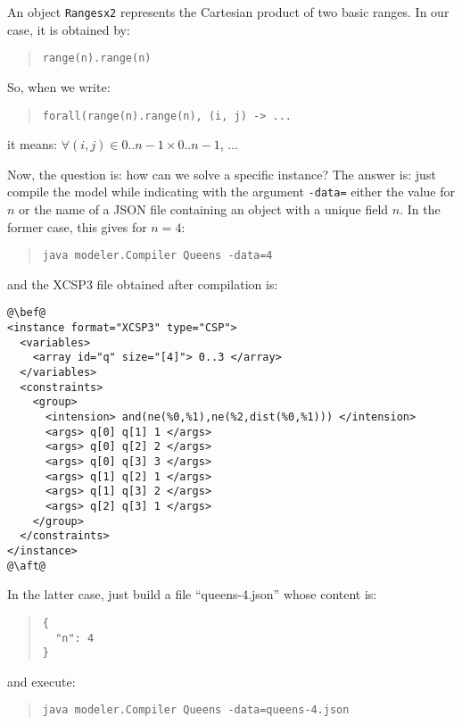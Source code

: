 \documentclass[10pt]{article}
\def\xt{{\rm XCSP3}\xspace}
\newcommand{\nn}[1]{{\tt #1}} %
\def\xt{{\rm XCSP3}\xspace}
\begin{document}
An object \nn{Rangesx2} represents the Cartesian product of two basic ranges. In our case, it is obtained by:
\begin{quote}
\begin{verbatim}
range(n).range(n)
\end{verbatim}
\end{quote}

So, when we write:
\begin{quote}
\begin{verbatim}
forall(range(n).range(n), (i, j) -> ...
\end{verbatim}
\end{quote}
it means: $\forall (i,j) \in 0..n-1 \times 0..n-1$, $\dots$

\bigskip
Now, the question is: how can we solve a specific instance?
The answer is: just compile the model while indicating with the argument \verb!-data=! either the value for $n$ or the name of a JSON file containing an object with a unique field $n$.
In the former case, this gives for $n=4$: 
\begin{quote}
\begin{verbatim}
java modeler.Compiler Queens -data=4
\end{verbatim}
\end{quote}

and the \xt file obtained after compilation is:

\begin{lstlisting}
@\bef@
<instance format="XCSP3" type="CSP">
  <variables>
    <array id="q" size="[4]"> 0..3 </array>
  </variables>
  <constraints>
    <group>
      <intension> and(ne(%0,%1),ne(%2,dist(%0,%1))) </intension>
      <args> q[0] q[1] 1 </args>
      <args> q[0] q[2] 2 </args>
      <args> q[0] q[3] 3 </args>
      <args> q[1] q[2] 1 </args>
      <args> q[1] q[3] 2 </args>
      <args> q[2] q[3] 1 </args>
    </group>
  </constraints>
</instance>
@\aft@
\end{lstlisting}

In the latter case, just build a file ``queens-4.json'' whose content is:
\begin{quote}
\begin{verbatim}
{
  "n": 4
}
\end{verbatim}
\end{quote}
and execute:
\begin{quote}
\begin{verbatim}
java modeler.Compiler Queens -data=queens-4.json
\end{verbatim}
\end{quote}
\end{document}
